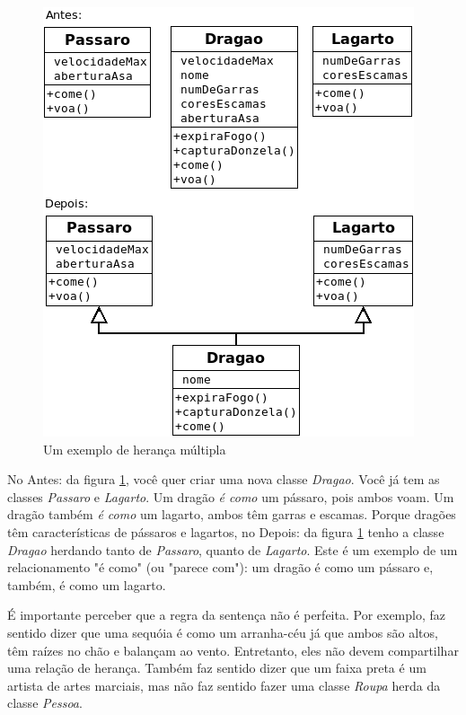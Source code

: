 \documentclass[
	article,			%
	12pt,				%
	openright,
	twoside,			%
	a4paper,			%
	english,			%
	french,
	brazil,				%
	sumario=tradicional
	]{abntex2}
\begin{document}
\begin{figure}
\begin{center}
\includegraphics[scale=0.6]{herMultCls.png} 
\caption{Um exemplo de herança múltipla} \label{fig:uml4}
\end{center}
\end{figure}

No Antes: da figura \ref{fig:uml4}, você quer criar uma nova classe \emph{Dragao}. Você já tem as classes \emph{Passaro} e \emph{Lagarto}. Um dragão \textit{é como} um pássaro, pois ambos voam. Um dragão também \textit{é como} um lagarto, ambos têm garras e escamas. Porque dragões têm características de pássaros e lagartos, no Depois: da figura \ref{fig:uml4} tenho a classe \emph{Dragao} herdando tanto de \emph{Passaro}, quanto de \emph{Lagarto}. Este é um exemplo de um relacionamento "é como" (ou "parece com"): um dragão é como um pássaro e, também, é como um lagarto.

É importante perceber que a regra da sentença não é perfeita. Por exemplo, faz sentido dizer que uma sequóia é como um arranha-céu já que ambos são altos, têm raízes no chão e balançam ao vento. Entretanto, eles não devem compartilhar uma relação de herança. Também faz sentido dizer que um faixa preta é um artista de artes marciais, mas não faz sentido fazer uma classe \emph{Roupa} herda da classe \emph{Pessoa}.
\end{document}
